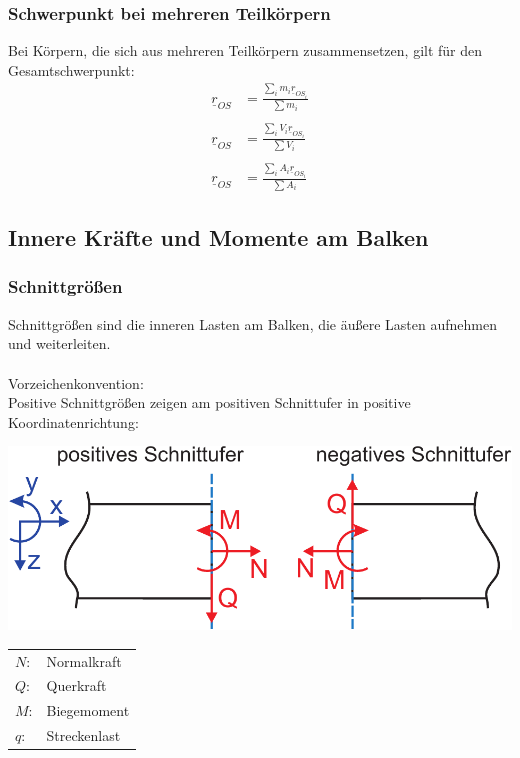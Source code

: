 \documentclass[a4paper,twocolumn,10pt]{article}
\begin{document}
\subsubsection{Schwerpunkt bei mehreren Teilkörpern}
Bei Körpern, die sich aus mehreren Teilkörpern zusammensetzen, gilt für den Gesamtschwerpunkt:
\begin{equation*}
\begin{split}
\underline{r}_{OS}&=\frac{\sum\limits_i m_i\underline{r}_{OS_i}}{\sum m_i}\\\\
\underline{r}_{OS}&=\frac{\sum\limits_i V_i\underline{r}_{OS_i}}{\sum V_i}\\\\
\underline{r}_{OS}&=\frac{\sum\limits_i A_i\underline{r}_{OS_i}}{\sum A_i}
\end{split}
\end{equation*}

\subsection{Innere Kräfte und Momente am Balken}

\subsubsection{Schnittgrößen}
Schnittgrößen sind die inneren Lasten am Balken, die äußere Lasten aufnehmen und weiterleiten.\\\\
Vorzeichenkonvention:\\
Positive Schnittgrößen zeigen am positiven Schnittufer in positive Koordinatenrichtung:
\begin{center}
\includegraphics[width=0.65\columnwidth]{Grafiken/Schnittufer}
\end{center}
\begin{tabular}{ll}
$N$: & Normalkraft\\
$Q$: & Querkraft\\
$M$: & Biegemoment\\
$q$: & Streckenlast
\end{tabular}
\end{document}

